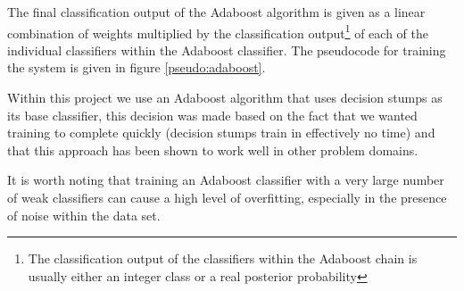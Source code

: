 \documentclass[ %
                    author={Sam Phippen},
                supervisor={Dr. Rafal Bogacz},
                     title={Real time voice activity detectors in noisy personal computing environments},
                  subtitle={},
                    degree={MEng},
                      year={2012} ]{thesis}
\begin{document}
The final classification output of the Adaboost algorithm is given as a linear
combination of weights multiplied by the classification output\footnote{The
    classification output of the classifiers within the Adaboost chain is
usually either an integer class or a real posterior probability} of each of
the individual classifiers within the Adaboost classifier. The pseudocode
for training the system is given in figure \ref{pseudo:adaboost}.

Within this project we use an Adaboost algorithm that uses decision stumps as
its base classifier, this decision was made based on the fact that we wanted
training to complete quickly (decision stumps train in effectively no time) and
that this approach has been shown to work well in other problem
domains\cite{viola}.

It is worth noting that training an Adaboost classifier with a very large
number of weak classifiers can cause a high level of overfitting, especially
in the presence of noise within the data set\cite{sun2006reducing}.
\end{document}
